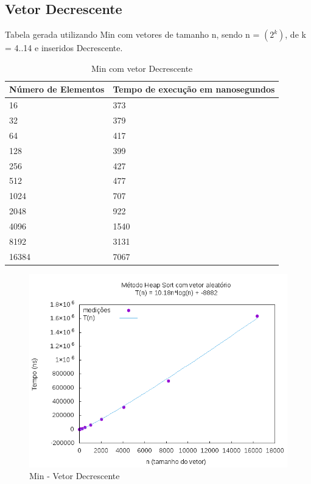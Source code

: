 \documentclass[12pt,a4paper,twoside]{report}
\begin{document}
\subsection{Vetor Decrescente}
Tabela gerada utilizando Min com vetores de tamanho n, sendo n = $(2^k)$, de k = 4..14 e inseridos Decrescente.
\begin{table}[H]
\centering
\caption{Min com vetor Decrescente}
\label{my-label}
\begin{tabular}{|l|l|}
\hline
\multicolumn{1}{|c|}{\textbf{Número de Elementos}} & \multicolumn{1}{c|}{\textbf{Tempo de execução em nanosegundos}} \\ \hline
16 & 373 \\ \hline
32 & 379 \\ \hline
64 & 417 \\ \hline
128 & 399 \\ \hline
256 & 427 \\ \hline
512 & 477 \\ \hline
1024 & 707 \\ \hline
2048 & 922 \\ \hline
4096 & 1540 \\ \hline
8192 & 3131 \\ \hline
16384 & 7067 \\ \hline
\end{tabular}
\end{table}

\begin{figure}[H]
    \centering
    \includegraphics[width=0.7\linewidth]{graficos/HeapSort/vIntAleatorio/vIntAleatorio.png}
  \caption{Min - Vetor Decrescente}
\end{figure}
\end{document}
